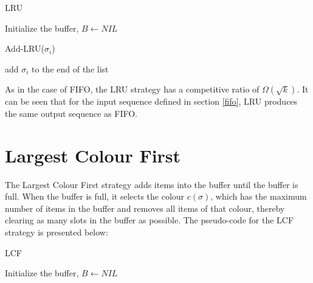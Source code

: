 \begin{algorithm}
\caption{LRU}
\label{leastrecentlyused}
Initialize the buffer, $B \gets NIL$ \;
\end{algorithm}

\begin{function*}
\caption{Add-LRU($\sigma_i$)}
\label{addlru}
add $\sigma_i$ to the end of the list \;\end{function*}

As in the case of FIFO, the LRU strategy has a competitive ratio of
$\Omega(\sqrt{k})$. It can be seen that for the input sequence defined in
section \ref{fifo}, LRU produces the same output sequence as FIFO.

\section{Largest Colour First} \label{lcf}
The Largest Colour First strategy adds items into the buffer until the buffer is
full. When the buffer is full, it selects the colour $c(\sigma)$, which has the
maximum number of items in the buffer and removes all items of that colour,
thereby clearing as many slots in the buffer as possible. The pseudo-code for
the LCF strategy is presented below:

\begin{algorithm}
\caption{LCF}
\label{largestcolourfirst}
Initialize the buffer, $B \gets NIL$ \;
\end{algorithm}

